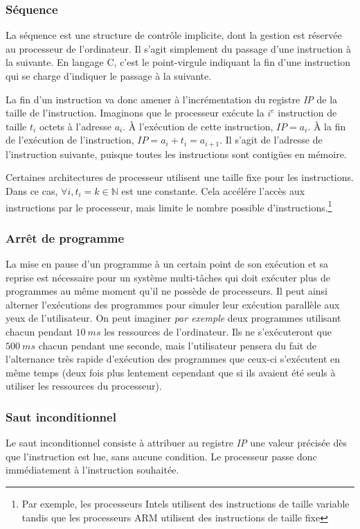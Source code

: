 \documentclass[../../../main.tex]{subfiles}
\begin{document}
\subsubsection{Séquence}
\label{ssub:s_quence}
La séquence est une structure de contrôle implicite, dont la gestion est réservée au processeur de l'ordinateur. Il s'agit simplement du passage d'une instruction à la suivante. En langage C, c'est le point-virgule indiquant la fin d'une instruction qui se charge d'indiquer le passage à la suivante.
 
La fin d'un instruction va donc amener à l'incrémentation du registre \textit{IP} de la taille de l'instruction. Imaginons que le processeur exécute la $i^e$ instruction de taille $t_{i}$ octets à l'adresse $a_{i}$. À l'exécution de cette instruction, $IP = a_{i}$. À la fin de l'exécution de l'instruction, $\textit{IP} = a_{i} + t_{i} = a_{i+1}$. Il s'agit de l'adresse de l'instruction suivante, puisque toutes les instructions sont contigües en mémoire.
 
Certaines architectures de processeur utilisent une taille fixe pour les instructions. Dans ce cas, $\forall{i}, t_{i} = k\in{\mathbb{N}}$ est une constante. Cela accélére l'accès aux instructions par le processeur, mais limite le nombre possible d'instructions.\footnote{Par exemple, les processeurs Intels utilisent des instructions de taille variable tandis que les processeurs ARM utilisent des instructions de taille fixe}
 
\subsubsection{Arrêt de programme}
\label{ssub:arr_t_de_programme}
La mise en pause d'un programme à un certain point de son exécution et sa reprise est nécessaire pour un système multi-tâches qui doit exécuter plus de programmes au même moment qu'il ne possède de processeurs. Il peut ainsi alterner l'exécutions des programmes pour simuler leur exécution parallèle aux yeux de l'utilisateur. On peut imaginer \textit{par exemple} deux programmes utilisant chacun pendant $10\ ms$ les ressources de l'ordinateur. Ils ne s'exécuteront que $500\ ms$ chacun pendant une seconde, mais l'utilisateur pensera du fait de l'alternance très rapide d'exécution des programmes que ceux-ci s'exécutent en même temps (deux fois plus lentement cependant que si ils avaient été seuls à utiliser les ressources du processeur).
 
\subsubsection{Saut inconditionnel}
\label{ssub:saut_inconditionnel}
Le saut inconditionnel consiste à attribuer au registre \textit{IP} une valeur précisée dès que l'instruction est lue, sans aucune condition. Le processeur passe donc immédiatement à l'instruction souhaitée.
 
\end{document}
